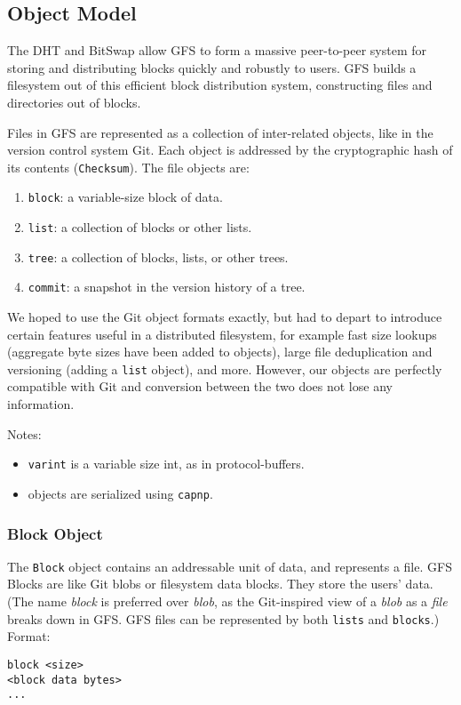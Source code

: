 \documentclass{sig-alternate}
\begin{document}

\subsection{Object Model}

The DHT and BitSwap allow GFS to form a massive peer-to-peer system for storing
and distributing blocks quickly and robustly to users.
GFS builds a filesystem out of this efficient block distribution system,
constructing files and directories out of blocks.

Files in GFS are represented as a collection of inter-related objects, like in
the version control system Git. Each object is addressed by the cryptographic
hash of its contents (\texttt{Checksum}). The file objects are:

\begin{enumerate}
  \item \texttt{block}: a variable-size block of data.
  \item \texttt{list}: a collection of blocks or other lists.
  \item \texttt{tree}: a collection of blocks, lists, or other trees.
  \item \texttt{commit}: a snapshot in the version history of a tree.
\end{enumerate}

We hoped to use the Git object formats exactly, but had to depart to introduce
certain features useful in a distributed filesystem, for example fast size
lookups (aggregate byte sizes have been added to objects), large file
deduplication and versioning (adding a \texttt{list} object), and more.
However, our objects are perfectly compatible with Git and
conversion between the two does not lose any information.

Notes:
\begin{itemize}
  \item \texttt{varint} is a variable size int, as in protocol-buffers.
  \item objects are serialized using \texttt{capnp}.
\end{itemize}

\subsubsection{Block Object}

The \texttt{Block} object contains an addressable unit of data, and
represents a file.
GFS Blocks are like Git blobs or filesystem data blocks. They store the
users' data. (The name \textit{block} is preferred over \textit{blob}, as the
Git-inspired view of a \textit{blob} as a \textit{file} breaks down in GFS.
GFS files can be represented by both \texttt{lists} and \texttt{blocks}.)
Format:
\begin{verbatim}
block <size>
<block data bytes>
...
\end{verbatim}
\end{document}
